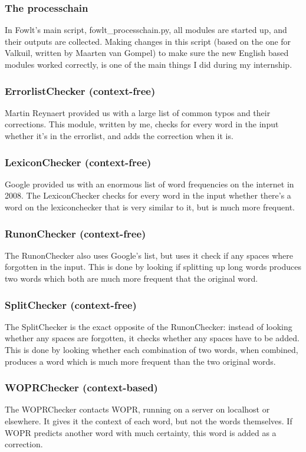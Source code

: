 \documentclass[12pt]{article}
\begin{document}
\subsubsection{The processchain}
In Fowlt's main script, fowlt\_processchain.py, all modules are started up, and their outputs are collected. Making changes in this script (based on the one for Valkuil, written by Maarten van Gompel) to make sure the new English based modules worked correctly, is one of the main things I did during my internship.

\subsubsection{ErrorlistChecker (context-free)}
Martin Reynaert provided us with a large list of common typos and their corrections. This module, written by me, checks for every word in the input whether it's in the errorlist, and adds the correction when it is.

\subsubsection{LexiconChecker (context-free)}
Google provided us with an enormous list of word frequencies on the internet in 2008. The LexiconChecker checks for every word in the input whether there's a word on the lexiconchecker that is very similar to it, but is much more frequent.

\subsubsection{RunonChecker (context-free)}
The RunonChecker also uses Google's list, but uses it check if any spaces where forgotten in the input. This is done by looking if splitting up long words produces two words which both are much more frequent that the original word.

\subsubsection{SplitChecker (context-free)}
The SplitChecker is the exact opposite of the RunonChecker: instead of looking whether any spaces are forgotten, it checks whether any spaces have to be added. This is done by looking whether each combination of two words, when combined, produces a word which is much more frequent than the two original words.

\subsubsection{WOPRChecker (context-based)}
The WOPRChecker contacts WOPR, running on a server on localhost or elsewhere. It gives it the context of each word, but not the words themselves. If WOPR predicts another word with much certainty, this word is added as a correction.  
\end{document}
